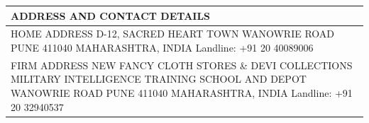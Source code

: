 \documentclass[a4paper,8pt]{extarticle}
\newcommand{\redfont}[1]{%
	{\color{textred}%
	\fontspec{Fjalla One}%
	\fontsize{14pt}{18pt}%
	\selectfont #1}}
\begin{document}
\bigskip
\begin{tabularx}{\linewidth}{X}
\large ADDRESS AND CONTACT DETAILS	\\\toprule
\redfont{HOME ADDRESS}\newline
D-12, SACRED HEART TOWN \newline
WANOWRIE ROAD \newline
PUNE 411040 \newline
MAHARASHTRA, INDIA \newline
Landline: +91 20 40089006 \\
\redfont{FIRM ADDRESS}\newline
NEW FANCY CLOTH STORES \& DEVI COLLECTIONS \newline
MILITARY INTELLIGENCE TRAINING SCHOOL AND DEPOT \newline
WANOWRIE ROAD \newline
PUNE 411040 \newline
MAHARASHTRA, INDIA \newline
Landline: +91 20 32940537 \\
\end{tabularx}\\
\end{document}
